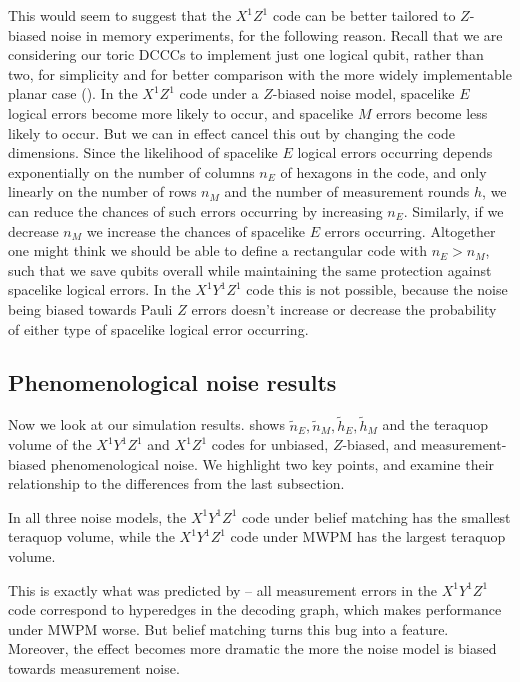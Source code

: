 This would seem to suggest that the $X^1 Z^1$ code can be better tailored to $Z$-biased noise in memory experiments,
for the following reason.
Recall that we are considering our toric DCCCs to implement just one logical qubit, rather than two, for simplicity and for better comparison with the more widely implementable planar case ().
In the $X^1 Z^1$ code under a $Z$-biased noise model, spacelike $E$ logical errors become more likely to occur,
and spacelike $M$ errors become less likely to occur.
But we can in effect cancel this out by changing the code dimensions.
Since the likelihood of spacelike $E$ logical errors occurring depends exponentially on the number of columns $n_E$ of hexagons in the code, and only linearly on the number of rows $n_M$ and the number of measurement rounds $h$, we can reduce the chances of such errors occurring by increasing $n_E$.
Similarly, if we decrease $n_M$ we increase the chances of spacelike $E$ errors occurring.
Altogether one might think we should be able to define a rectangular code with $n_E > n_M$,
such that we save qubits overall while maintaining the same protection against spacelike logical errors.
In the $X^1 Y^1 Z^1$ code this is not possible, because the noise being biased towards Pauli $Z$ errors doesn't increase or decrease the probability of either type of spacelike logical error occurring.

\subsection{Phenomenological noise results}\label{subsec:unrepetaed-phenomenological-noise}

Now we look at our simulation results.
 shows $\tilde{n}_E, \tilde{n}_M, \tilde{h}_E, \tilde{h}_M$ and the teraquop volume of the $X^1Y^1Z^1$ and $X^1Z^1$ codes for unbiased, $Z$-biased, and measurement-biased phenomenological noise.
We highlight two key points, and examine their relationship to the differences from the last subsection.

\begin{keypoint}\label{key:XYZ_XZ_best_and_worst}
In all three noise models, the $X^1 Y^1 Z^1$ code under belief matching has the smallest teraquop volume,
while the $X^1 Y^1 Z^1$ code under MWPM has the largest teraquop volume.
\end{keypoint}

This is exactly what was predicted by  -- all measurement errors in the $X^1 Y^1 Z^1$ code correspond to hyperedges in the decoding graph, which makes performance under MWPM worse.
But belief matching turns this bug into a feature.
Moreover, the effect becomes more dramatic the more the noise model is biased towards measurement noise.

